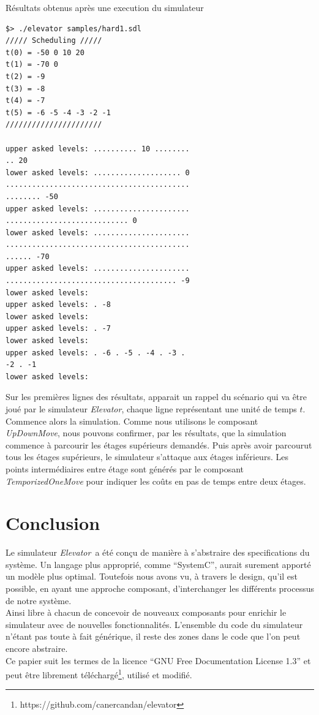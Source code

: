 \documentclass[twocolumn,oneside,10pt]{article}
\newcommand {\elevator}   {{\em Elevator}}
\begin{document}
\begin{algorithm}[h]
  \caption{Résultats obtenus après une execution du simulateur}
  \label{exemple_execution}
\begin{verbatim}
$> ./elevator samples/hard1.sdl
///// Scheduling /////
t(0) = -50 0 10 20
t(1) = -70 0
t(2) = -9
t(3) = -8
t(4) = -7
t(5) = -6 -5 -4 -3 -2 -1
//////////////////////

upper asked levels: .......... 10 ........
.. 20
lower asked levels: .................... 0
..........................................
........ -50
upper asked levels: ......................
............................ 0
lower asked levels: ......................
..........................................
...... -70
upper asked levels: ......................
....................................... -9
lower asked levels:
upper asked levels: . -8
lower asked levels:
upper asked levels: . -7
lower asked levels:
upper asked levels: . -6 . -5 . -4 . -3 .
-2 . -1
lower asked levels:
\end{verbatim}
\end{algorithm}

Sur les premières lignes des résultats, apparait un rappel du scénario qui va être joué par le simulateur \elevator, chaque ligne représentant une unité de temps $t$. Commence alors la simulation. Comme nous utilisons le composant {\em UpDownMove}, nous pouvons confirmer, par les résultats, que la simulation commence à parcourir les étages supérieurs demandés. Puis après avoir parcourut tous les étages supérieurs, le simulateur s'attaque aux étages inférieurs. Les points intermédiaires entre étage sont générés par le composant {\em TemporizedOneMove} pour indiquer les coûts en pas de temps entre deux étages.

\section{Conclusion}

Le simulateur \elevator\ a été conçu de manière à s'abstraire des specifications du système. Un langage plus approprié, comme ``SystemC'', aurait surement apporté un modèle plus optimal. Toutefois nous avons vu, à travers le design, qu'il est possible, en ayant une approche composant, d'interchanger les différents processus de notre système.\\

Ainsi libre à chacun de concevoir de nouveaux composants pour enrichir le simulateur avec de nouvelles fonctionnalités. L'ensemble du code du simulateur n'étant pas toute à fait générique, il reste des zones dans le code que l'on peut encore abstraire.\\

Ce papier suit les termes de la licence ``GNU Free Documentation License 1.3'' et peut être librement téléchargé\footnote{https://github.com/canercandan/elevator}, utilisé et modifié.
\end{document}
